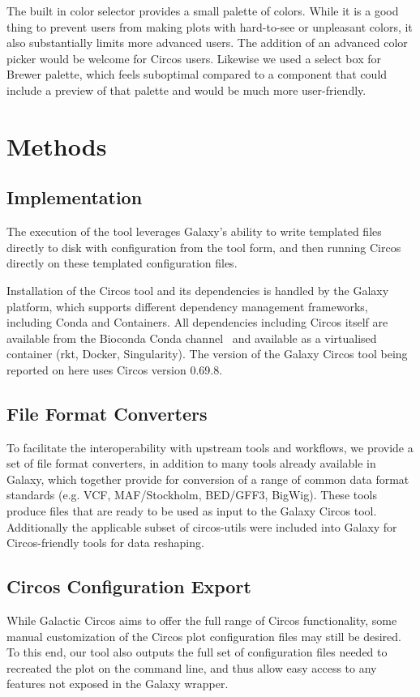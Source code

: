 The built in color selector provides a small palette of colors. While it is a good thing to prevent users from making plots with hard-to-see or unpleasant colors, it also substantially limits more advanced users. The addition of an advanced color picker would be welcome for Circos users. Likewise we used a select box for Brewer palette, which feels suboptimal compared to a component that could include a preview of that palette and would be much more user-friendly.


\section*{Methods}

\subsection*{Implementation}
The execution of the tool leverages Galaxy's ability to write templated files directly to disk with configuration from the tool form, and then running Circos directly on these templated configuration files.

Installation of the Circos tool and its dependencies is handled by the Galaxy platform, which supports different dependency management frameworks, including Conda and Containers. All dependencies including Circos itself are available from the Bioconda Conda channel~\cite{gruning2018bioconda} and available as a virtualised container (rkt, Docker, Singularity). The version of the Galaxy Circos tool being reported on here uses Circos version 0.69.8.

\subsection*{File Format Converters}
To facilitate the interoperability with upstream tools and workflows, we provide a set of file format converters, in addition to many tools already available in Galaxy, which together provide for conversion of a range of common data format standards (e.g. VCF, MAF/Stockholm, BED/GFF3, BigWig). These tools produce files that are ready to be used as input to the Galaxy Circos tool. Additionally the applicable subset of circos-utils were included into Galaxy for Circos-friendly tools for data reshaping.

\subsection*{Circos Configuration Export}
While Galactic Circos aims to offer the full range of Circos functionality, some manual customization of the Circos plot configuration files may still be desired. To this end, our tool also outputs the full set of configuration files needed to recreated the plot on the command line, and thus allow easy access to any features not exposed in the Galaxy wrapper.


